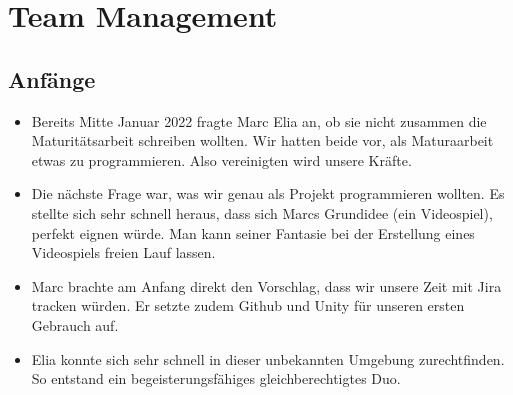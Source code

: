 \chapter{Team Management}

\section{Anfänge}
\begin{itemize}
    \item Bereits Mitte Januar 2022 fragte Marc Elia an, ob sie nicht zusammen die Maturitätsarbeit schreiben wollten. Wir hatten beide vor, als Maturaarbeit etwas zu programmieren. Also vereinigten wird unsere Kräfte.
    \item Die nächste Frage war, was wir genau als Projekt programmieren wollten. Es stellte sich sehr schnell heraus, dass sich Marcs Grundidee (ein Videospiel), perfekt eignen würde. Man kann seiner Fantasie bei der Erstellung eines Videospiels
    freien Lauf lassen.
    \item Marc brachte am Anfang direkt den Vorschlag, dass wir unsere Zeit mit Jira tracken würden. Er setzte zudem Github und Unity für unseren ersten Gebrauch auf. 
    \item Elia konnte sich sehr schnell in dieser unbekannten Umgebung zurechtfinden. So entstand ein begeisterungsfähiges gleichberechtigtes Duo.
\end{itemize}

